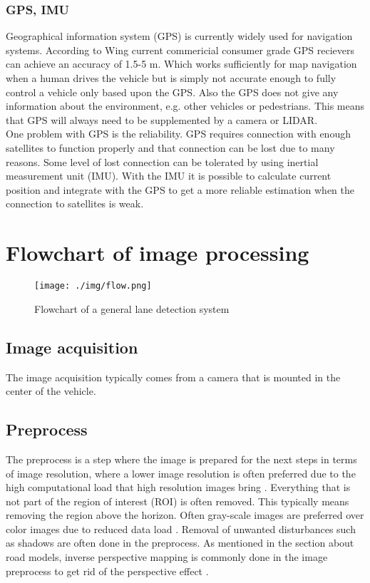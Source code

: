 \subsubsection{GPS, IMU}
Geographical information system (GPS) is currently widely used for navigation systems. According to Wing \cite{wing2011} current commericial consumer grade GPS recievers can achieve an accuracy of 1.5-5 m. Which works sufficiently for map navigation when a human drives the vehicle but is simply not accurate enough to fully control a vehicle only based upon the GPS. Also the GPS does not give any information about the environment, e.g. other vehicles or pedestrians. This means that GPS will always need to be supplemented by a camera or LIDAR.\\
 
One problem with GPS is the reliability. GPS requires connection with enough satellites to function properly and that connection can be lost due to many reasons. Some level of lost connection can be tolerated by using inertial measurement unit (IMU). With the IMU it is possible to calculate current position and integrate with the GPS to get a more reliable estimation when the connection to satellites is weak.

\section{Flowchart of image processing}

\begin{figure}[H]
  \texttt{[image: ./img/flow.png]}
  \centering
  \caption{Flowchart of a general lane detection system}
  \label{fig:Software architecture of the EMC2 platform}
\end{figure}

\subsection{Image acquisition}
The image acquisition typically comes from a camera that is mounted in the center of the vehicle.

\subsection{Preprocess}
The preprocess is a step where the image is prepared for the next steps in terms of image resolution, where a lower image resolution is often preferred due to the high computational load that high resolution images bring \cite{Yenikaya:2013:KVR:2522968.2522970}. Everything that is not part of the region of interest (ROI) is often removed. This typically means removing the region above the horizon. Often gray-scale images are preferred over color images due to reduced data load \cite{Yenikaya:2013:KVR:2522968.2522970}. Removal of unwanted disturbances such as shadows are often done in the preprocess. As mentioned in the section about road models, inverse perspective mapping is commonly done in the image preprocess to get rid of the perspective effect \cite{bertozzi1998gold}.

